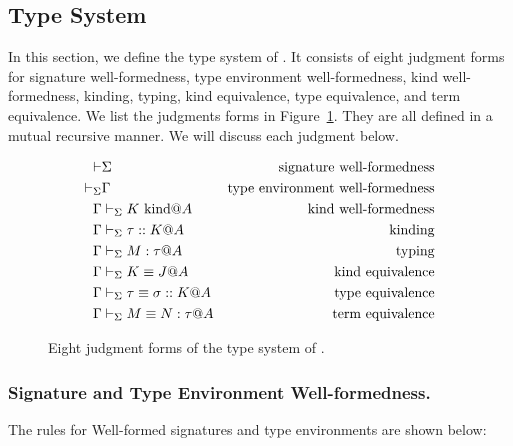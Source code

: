 
\subsection{Type System}

In this section, we define the type system of \LMD.
It consists of eight judgment forms for signature well-formedness, type environment well-formedness, kind well-formedness, kinding, typing, kind equivalence, type equivalence, and term equivalence.
We list the judgments forms in Figure~\ref{fig:LMD-six-judgments}.
They are all defined in a mutual recursive manner.  We will discuss
each judgment below.

\begin{figure}[tbp]
  \begin{center}
    \begin{align*}
      \vdash & \Sigma                     & \text{signature well-formedness}        \\
      \vdash_\Sigma     & \Gamma                         & \text{type environment well-formedness} \\
      \Gamma     & \vdash_\Sigma K \text{\ kind} @ A           & \text{kind well-formedness}             \\
      \Gamma     & \vdash_\Sigma \tau :: K @ A           & \text{kinding}                          \\
      \Gamma     & \vdash_\Sigma M : \tau @ A            & \text{typing}                           \\
      \Gamma     & \vdash_\Sigma K \equiv J @ A              & \text{kind equivalence}                 \\
      \Gamma     & \vdash_\Sigma \tau \equiv \sigma :: K @ A & \text{type equivalence}                 \\
      \Gamma     & \vdash_\Sigma M \equiv N : \tau @ A       & \text{term equivalence}
    \end{align*}
    \caption{Eight judgment forms of the type system of \LMD.}
    \label{fig:LMD-six-judgments}
  \end{center}
\end{figure}


\subsubsection{Signature and Type Environment Well-formedness.}
The rules for Well-formed signatures and type environments are
shown below:
%
{\small
\begin{center}
  \infrule{
  }{
    \vdash \emptyset
  }
  \hfil
  \hfil
  \\[2mm]
  \infrule{
  }{
    \V \emptyset
  }
  \hfil
\end{center}
}

